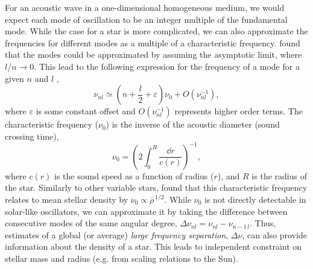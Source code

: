 For an acoustic wave in a one-dimensional homogeneous medium, we would expect each mode of oscillation to be an integer multiple of the fundamental mode. While the case for a star is more complicated, we can also approximate the frequencies for different modes as a multiple of a characteristic frequency. \citet{Tassoul1980} found that the modes could be approximated by assuming the asymptotic limit, where \(l/n \rightarrow 0\). This lead to the following expression for the frequency of a mode for a given \(n\) and \(l\) \citep[cf.][]{Gough1986},
%
\begin{equation}
    \nu_{nl} \simeq \left(n + \frac{l}{2} + \varepsilon\right) \nu_0 + O(\nu_{nl}^{-1}), \label{eq:asy}
\end{equation}
%
where \(\varepsilon\) is some constant offset and \(O(\nu_{nl}^{-1})\) represents higher order terms. The characteristic frequency (\(\nu_0\)) is the inverse of the acoustic diameter (sound crossing time),
%
\begin{equation}
    \nu_0 = \left(2 \int_{0}^{R} \frac{\dd r}{c(r)}\right)^{-1},
\end{equation}
%
where \(c(r)\) is the sound speed as a function of radius (\(r\)), and \(R\) is the radius of the star. Similarly to other variable stars, \citet{Ulrich1986} found that this characteristic frequency relates to mean stellar density by \(\nu_0 \propto \overline{\rho}^{\,1/2}\). While \(\nu_0\) is not directly detectable in solar-like oscillators, we can approximate it by taking the difference between consecutive modes of the same angular degree, \(\Delta\nu_{nl} = \nu_{nl} - \nu_{n-1\,l}\). Thus, estimates of a global (or average) \emph{large frequency separation}, \(\Delta\nu\), can also provide information about the density of a star. This leads to independent constraint on stellar mass and radius (e.g. from scaling relations to the Sun).

